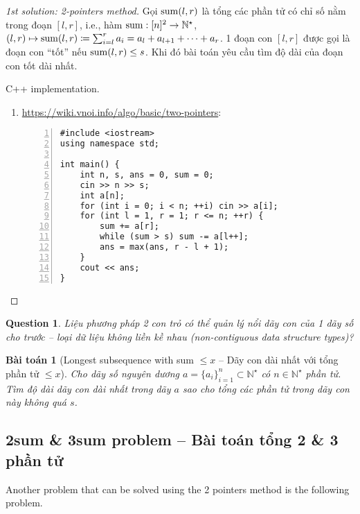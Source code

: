 \documentclass{article}
\newtheorem{baitoan}{Bài toán}
\newtheorem{question}{Question}
\begin{document}
\begin{proof}[1st solution: 2-pointers method]
     Gọi ${\rm sum}(l,r)$ là tổng các phần tử có chỉ số nằm trong đoạn $[l,r]$, i.e., hàm ${\rm sum}:[n]^2\to\mathbb{N}^\star$, $(l,r)\mapsto{\rm sum}(l,r)\coloneqq\sum_{i=l}^r a_i = a_l + a_{l+1} + \cdots + a_r$. 1 đoạn con $[l,r]$ được gọi là đoạn con ``tốt'' nếu ${\rm sum}(l,r)\le s$. Khi đó bài toán yêu cầu tìm độ dài của đoạn con tốt dài nhất.

     \item {\sf C++ implementation.}
     \begin{enumerate}
         \item \url{https://wiki.vnoi.info/algo/basic/two-pointers}:
         \begin{Verbatim}[numbers=left,xleftmargin=5mm]
#include <iostream>
using namespace std;

int main() {
    int n, s, ans = 0, sum = 0;
    cin >> n >> s;
    int a[n];
    for (int i = 0; i < n; ++i) cin >> a[i];
    for (int l = 1, r = 1; r <= n; ++r) {
        sum += a[r];
        while (sum > s) sum -= a[l++];
        ans = max(ans, r - l + 1);
    }
    cout << ans;
}
         \end{Verbatim}
     \end{enumerate}

\end{proof}

\begin{question}
    Liệu phương pháp 2 con trỏ có thể quản lý nổi dãy con của 1 dãy số cho trước -- loại dữ liệu không liền kề nhau (non-contiguous data structure types)?
\end{question}

\begin{baitoan}[Longest subsequence with sum $\le x$ -- Dãy con dài nhất với tổng phần tử $\le x$]
    Cho dãy số nguyên dương $a = \{a_i\}_{i=1}^n\subset\mathbb{N}^\star$ có $n\in\mathbb{N}^\star$ phần tử. Tìm độ dài dãy con dài nhất trong dãy $a$ sao cho tổng các phần tử trong dãy con này không quá $s$.
\end{baitoan}


\subsection{{\sc2sum} \& {\sc3sum} problem -- Bài toán tổng 2 \& 3 phần tử}
Another problem that can be solved using the 2 pointers method is the following {} problem.
\end{document}
